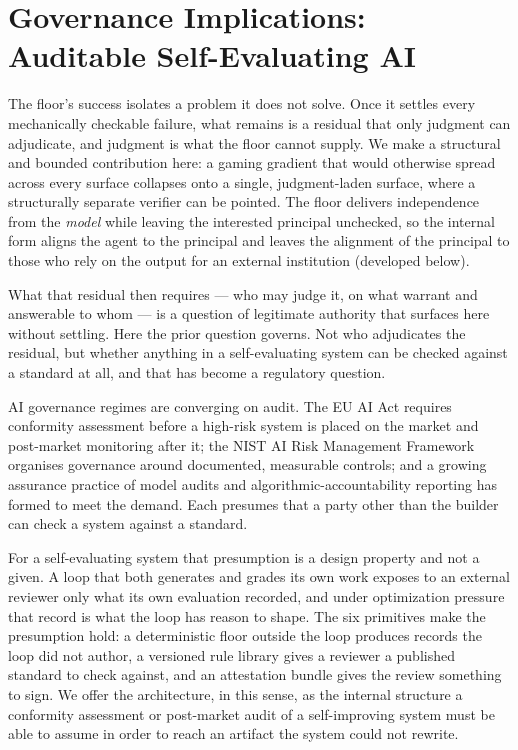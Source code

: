 \documentclass[11pt]{article}
\begin{document}
\section{Governance Implications: Auditable Self-Evaluating AI}

The floor's success isolates a problem it does not solve. Once it settles every mechanically checkable failure, what remains is a residual that only judgment can adjudicate, and judgment is what the floor cannot supply. We make a structural and bounded contribution here: a gaming gradient that would otherwise spread across every surface collapses onto a single, judgment-laden surface, where a structurally separate verifier can be pointed. The floor delivers independence from the \emph{model} while leaving the interested principal unchecked, so the internal form aligns the agent to the principal and leaves the alignment of the principal to those who rely on the output for an external institution (developed below).

What that residual then requires --- who may judge it, on what warrant and answerable to whom --- is a question of legitimate authority that surfaces here without settling. Here the prior question governs. Not who adjudicates the residual, but whether anything in a self-evaluating system can be checked against a standard at all, and that has become a regulatory question.

AI governance regimes are converging on audit. The EU AI Act requires conformity assessment before a high-risk system is placed on the market and post-market monitoring after it; the NIST AI Risk Management Framework organises governance around documented, measurable controls; and a growing assurance practice of model audits and algorithmic-accountability reporting has formed to meet the demand. Each presumes that a party other than the builder can check a system against a standard.

For a self-evaluating system that presumption is a design property and not a given. A loop that both generates and grades its own work exposes to an external reviewer only what its own evaluation recorded, and under optimization pressure that record is what the loop has reason to shape. The six primitives make the presumption hold: a deterministic floor outside the loop produces records the loop did not author, a versioned rule library gives a reviewer a published standard to check against, and an attestation bundle gives the review something to sign. We offer the architecture, in this sense, as the internal structure a conformity assessment or post-market audit of a self-improving system must be able to assume in order to reach an artifact the system could not rewrite.
\end{document}
